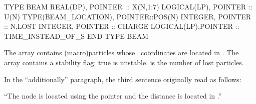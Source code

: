 \begin{ptccode}
TYPE BEAM
  REAL(DP), POINTER~:: X(N,1:7)
  LOGICAL(LP), POINTER :: U(N)
  TYPE(BEAM_LOCATION), POINTER::POS(N)
  INTEGER, POINTER :: N,LOST
  INTEGER, POINTER :: CHARGE
  LOGICAL(LP),POINTER :: TIME_INSTEAD_OF_S
END TYPE BEAM
\end{ptccode}

The array  contains  (macro)particles whose \PTC\
co\"ordinates are located in . The array  contains
a stability flag: true is unstable. \ptc{LOST} is the number of lost particles.

In the ``additionally'' paragraph, the third sentence originally read as follows:

``The node is located using the pointer  and the distance
is located in \ptc{X(N,7)}.''

\makeussubscript
\endinput

